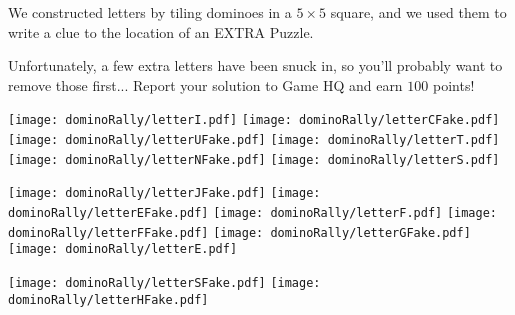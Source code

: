 
\begin{puzzle}
  We constructed letters by tiling dominoes in a $5\times5$ square, and we
  used them to write a clue to the location of an EXTRA Puzzle.

  Unfortunately, a few extra letters have been snuck in, so you'll
  probably want to remove those first... Report your solution to
  Game HQ and earn \(100\) points!

\begin{center}
  \texttt{[image: dominoRally/letterI.pdf]}\hspace{0.03\linewidth}
  \texttt{[image: dominoRally/letterCFake.pdf]}\hspace{0.03\linewidth}
  \texttt{[image: dominoRally/letterUFake.pdf]}\hspace{0.03\linewidth}
  \texttt{[image: dominoRally/letterT.pdf]}\hspace{0.03\linewidth}
  \texttt{[image: dominoRally/letterNFake.pdf]}\hspace{0.03\linewidth}
  \texttt{[image: dominoRally/letterS.pdf]}\hspace{0.03\linewidth}
\end{center}
\begin{center}
  \texttt{[image: dominoRally/letterJFake.pdf]}\hspace{0.03\linewidth}
  \texttt{[image: dominoRally/letterEFake.pdf]}\hspace{0.03\linewidth}
  \texttt{[image: dominoRally/letterF.pdf]}\hspace{0.03\linewidth}
  \texttt{[image: dominoRally/letterFFake.pdf]}\hspace{0.03\linewidth}
  \texttt{[image: dominoRally/letterGFake.pdf]}\hspace{0.03\linewidth}
  \texttt{[image: dominoRally/letterE.pdf]}\hspace{0.03\linewidth}
\end{center}
\begin{center}
  \texttt{[image: dominoRally/letterSFake.pdf]}\hspace{0.03\linewidth}
  \texttt{[image: dominoRally/letterHFake.pdf]}\hspace{0.03\linewidth}

\end{center}
\end{puzzle}

